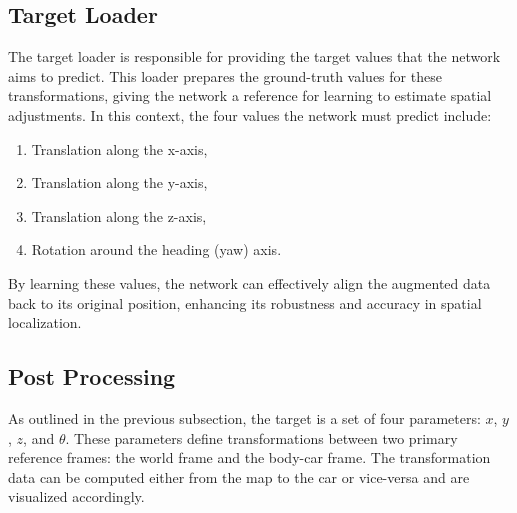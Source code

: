 \subsection{Target Loader}
The target loader is responsible for providing the target values that the network aims to predict. This loader prepares the ground-truth values for these transformations, giving the network a reference for learning to estimate spatial adjustments. In this context, the four values the network must predict include:
\begin{enumerate}
    \item Translation along the x-axis,
    \item Translation along the y-axis,
    \item Translation along the z-axis, 
    \item Rotation around the heading (yaw) axis.
\end{enumerate}
By learning these values, the network can effectively align the augmented data back to its original position, enhancing its robustness and accuracy in spatial localization.

\subsection{Post Processing}

As outlined in the previous subsection, the target is a set of four parameters: \( x \), \( y \), \( z \), and \( \theta \). These parameters define transformations between two primary reference frames: the world frame and the body-car frame. The transformation data can be computed either from the map to the car or vice-versa and are visualized accordingly.

